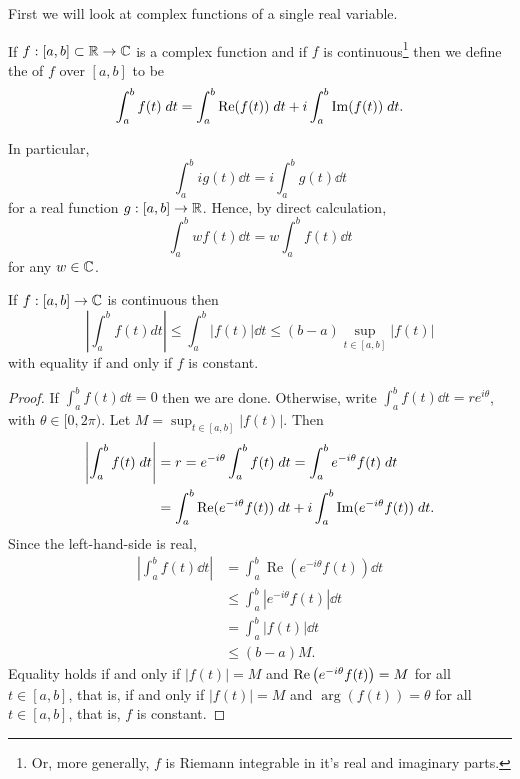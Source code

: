 \documentclass[a4paper]{scrartcl}
\begin{document}
First we will look at complex functions of a single real variable.

\begin{definition}
    If $f: [a, b] \subset \mathbb{R} \rightarrow \mathbb{C}$ is a complex function and if $f$ is continuous\footnote{Or, more generally, $f$ is Riemann integrable in it's real and imaginary parts.} then we define the  of $f$ over $[a, b]$ to be
    $$
    \int_a^b f(t) \; d t = \int_a^b \operatorname{Re}(f(t)) \; d t + i \int_a^b \operatorname{Im}(f(t)) \; d t.
    $$
\end{definition}

In particular,
    $$
    \int_a^b i g(t) \dd t = i \int_a^b g(t) \dd t
    $$
    for a real function $g: [a, b] \rightarrow \mathbb{R}$. Hence, by direct calculation,
    $$
\int_a^b w f(t) \dd t = w \int_a^b f(t) \dd t
    $$
    for any $w \in \mathbb{C}$.

\begin{proposition}
    If $f: [a, b] \rightarrow \mathbb{C}$ is continuous then
    $$
    \left|\int_{a}^{b} f(t) d t\right| \leq \int_{a}^{b}|f(t)| \dd t \leq(b-a) \sup _{t \in[a, b]}|f(t)|
    $$
    with equality if and only if $f$ is constant.
\end{proposition}
\begin{proof}
    If $\int_a^b f(t) \dd t = 0$ then we are done. Otherwise, write $\int_a^b f(t) \dd t = re^{i \theta}$, with $\theta \in [0, 2\pi)$. Let $M = \sup_{t \in [a, b]} |f(t)|$. Then
    \begin{align*}
        \left|\int_a^b f(t) \; d t\right| &= r = e^{-i \theta} \int_a^b f(t) \; d t = \int_a^b e^{-i \theta} f(t) \; d t \\
        &= \int_a^b \operatorname{Re}(e^{-i \theta} f(t)) \; d t + i \int_a^b \operatorname{Im}(e^{- i \theta} f(t)) \; d t.
    \end{align*}
    Since the left-hand-side is real,
    \begin{align*}
        \left|\int_{a}^{b} f(t) \dd t\right|&=\int_{a}^{b} \operatorname{Re}\left(e^{-i \theta} f(t)\right) \dd t \\
        &\leq \int_{a}^{b}\left|e^{-i \theta} f(t)\right| \dd t \\
        &= \int_a^b |f(t)| \dd t \\
        & \leq (b - a) M.
    \end{align*}
    Equality holds if and only if $|f(t)|=M$ and $\operatorname{Re}\left(e^{-i \theta} f(t)\right)=M$ for all $t \in[a, b]$, that is, if and only if $|f(t)|=M$ and $\arg (f(t))=\theta$ for all $t \in[a, b]$, that is, $f$ is constant.
\end{proof}
\end{document}
